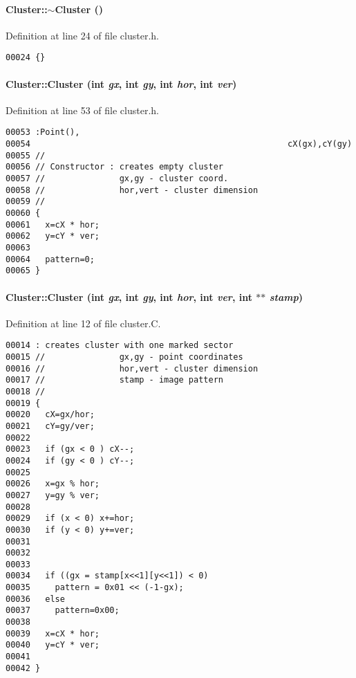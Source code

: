 \paragraph{\setlength{\rightskip}{0pt plus 5cm}Cluster::$\sim$Cluster ()\hspace{0.3cm}{\tt  [inline]}}\hfill



Definition at line 24 of file cluster.h.\small\begin{verbatim}00024 {}
\end{verbatim}\normalsize 
\label{Cluster_a1}
\paragraph{\setlength{\rightskip}{0pt plus 5cm}Cluster::Cluster (int {\em gx}, int {\em gy}, int {\em hor}, int {\em ver})\hspace{0.3cm}{\tt  [inline]}}\hfill



Definition at line 53 of file cluster.h.\small\begin{verbatim}00053 :Point(),
00054                                                    cX(gx),cY(gy)
00055 //
00056 // Constructor : creates empty cluster 
00057 //               gx,gy - cluster coord.
00058 //               hor,vert - cluster dimension
00059 // 
00060 {
00061   x=cX * hor;
00062   y=cY * ver;
00063   
00064   pattern=0;
00065 }
\end{verbatim}\normalsize 
\label{Cluster_a2}
\paragraph{\setlength{\rightskip}{0pt plus 5cm}Cluster::Cluster (int {\em gx}, int {\em gy}, int {\em hor}, int {\em ver}, int $\ast$$\ast$ {\em stamp})}\hfill



Definition at line 12 of file cluster.C.\small\begin{verbatim}00014 : creates cluster with one marked sector  
00015 //               gx,gy - point coordinates 
00016 //               hor,vert - cluster dimension
00017 //               stamp - image pattern
00018 //
00019 {
00020   cX=gx/hor;
00021   cY=gy/ver;
00022 
00023   if (gx < 0 ) cX--;
00024   if (gy < 0 ) cY--;
00025 
00026   x=gx % hor;
00027   y=gy % ver;
00028 
00029   if (x < 0) x+=hor;
00030   if (y < 0) y+=ver;
00031 
00032   
00033 
00034   if ((gx = stamp[x<<1][y<<1]) < 0)
00035     pattern = 0x01 << (-1-gx);
00036   else
00037     pattern=0x00;
00038   
00039   x=cX * hor;
00040   y=cY * ver;
00041 
00042 }
\end{verbatim}\normalsize 


